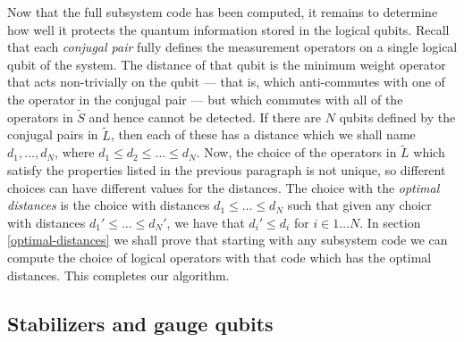 \documentclass[twocolumn,showpacs,preprintnumbers,amsmath,amssymb,nofootinbib,pra,floatfix]{revtex4}
\begin{document}
Now that the full subsystem code has been computed, it remains to determine how well it protects the quantum information stored in the logical qubits.  Recall that each \emph{conjugal pair} fully defines the measurement operators on a single logical qubit of the system.  The distance of that qubit is the minimum weight operator that acts non-trivially on the qubit --- that is, which anti-commutes with one of the operator in the conjugal pair --- but which commutes with all of the operators in $\tilde S$ and hence cannot be detected.  If there are $N$ qubits defined by the conjugal pairs in $\tilde L$, then each of these has a distance which we shall name $d_1,\dots,d_N$, where $d_1\le d_2 \le \dots \le d_N$.  Now, the choice of the operators in $\tilde L$ which satisfy the properties listed in the previous paragraph is not unique, so different choices can have different values for the distances.  The choice with the \emph{optimal distances} is the choice with distances $d_1\le \dots \le d_N$ such that given any choicr with distances $d_1'\le \dots \le d_N'$, we have that $d_i' \le d_i$ for $i\in 1\dots N$.  In section \ref{optimal-distances} we shall prove that starting with any subsystem code we can compute the choice of logical operators with that code which has the optimal distances.  This completes our algorithm.
\subsection{Stabilizers and gauge qubits}
\end{document}
